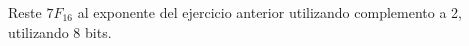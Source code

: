 \documentclass[addpoints]{exam}
\begin{document}
\begin{questions}




\question[1] Reste $7F_{16}$ al exponente del ejercicio anterior utilizando complemento a 2, utilizando 8 bits.











\end{questions}

\begin{center}
  \scriptsize
  \combinedgradetable[h][questions]
\end{center}
\end{document}
